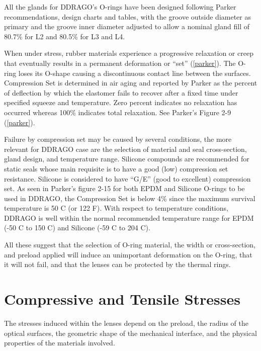 \documentclass{report}
\begin{document}
All the glands for DDRAGO’s O-rings have been designed following Parker recommendations, design charts and tables, with the groove outside diameter as primary and the groove inner diameter adjusted to allow a nominal gland fill of 80.7\% for L2 and 80.5\% for L3 and L4.

When under stress, rubber materials experience a progressive relaxation or creep that eventually results in a permanent deformation or “set” (\ref{parker}). The O-ring loses its O-shape causing a discontinuous contact line between the surfaces. Compression Set is determined in air aging and reported by Parker as the percent of deflection by which the elastomer fails to recover after a fixed time under specified squeeze and temperature. Zero percent indicates no relaxation has occurred whereas 100\% indicates total relaxation. See Parker’s Figure 2-9 (\ref{parker}).

Failure by compression set may be caused by several conditions, the more relevant for DDRAGO case are the selection of material and seal cross-section, gland design, and temperature range. Silicone compounds are recommended for static seals whose main requisite is to have a good (low) compression set resistance. Silicone is considered to have ``G/E'' (good to excellent) compression set.
As seen in Parker’s figure 2-15 for both EPDM and Silicone O-rings to be used in DDRAGO, the Compression Set is below 4\% since the maximum survival temperature is 50 C (or 122 F). With respect to temperature conditions, DDRAGO is well within the normal recommended temperature range for EPDM (-50 C to 150 C) and Silicone (-59 C to 204 C).

All these suggest that the selection of O-ring material, the width or cross-section, and preload applied will induce an unimportant deformation on the O-ring, that it will not fail, and that the lenses can be protected by the thermal rings.

\section{Compressive and Tensile Stresses}

The stresses induced within the lenses depend on the preload, the radius of the optical surfaces, the geometric shape of the mechanical interface, and the physical properties of the materials involved.
\end{document}
